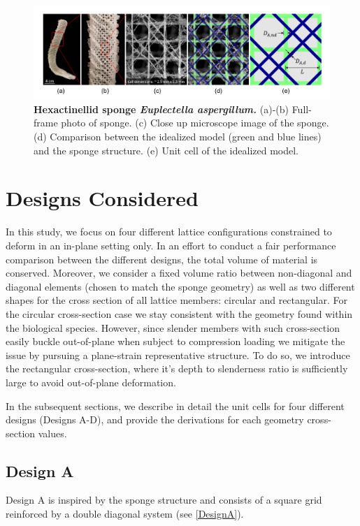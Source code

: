 \documentclass[10pt,twoside]{fernandes_supp}
\begin{document}
\begin{figure}[H]
    \centering
    \includegraphics[width=0.9\linewidth]{SFig1.png}
    \caption{\textbf{Hexactinellid sponge \textit{Euplectella aspergillum.}} (a)-(b) Full-frame photo of sponge.  (c)  Close up microscope image of the sponge. (d) Comparison between the idealized model (green and blue lines) and the sponge structure. (e) Unit cell of the idealized model.}
    \label{Sponge}
\end{figure}

\section{Designs Considered}\label{sec:designs}
In this study, we focus on four different lattice configurations constrained to deform in an in-plane setting only. In an effort to conduct a fair performance comparison between the different designs, the total volume of material is conserved. Moreover,  we consider a fixed volume ratio between non-diagonal and diagonal elements (chosen to match the sponge geometry) as well as two different shapes for the cross section of all lattice members: circular and rectangular.  For the circular cross-section case  we stay consistent with the geometry found within the biological species. However, since slender members with such cross-section easily buckle out-of-plane when subject to compression loading we mitigate the issue by pursuing a plane-strain representative structure. To do so, we introduce the rectangular cross-section, where it's depth to slenderness ratio is sufficiently large to avoid out-of-plane deformation. 

In the subsequent sections, we describe in detail the unit cells for four different designs (Designs A-D), and provide the derivations for each geometry cross-section values. 

\subsection{Design A}
Design A is inspired by the sponge structure and consists of a square grid  reinforced by a double diagonal system (see \cref{DesignA}). 
\end{document}

